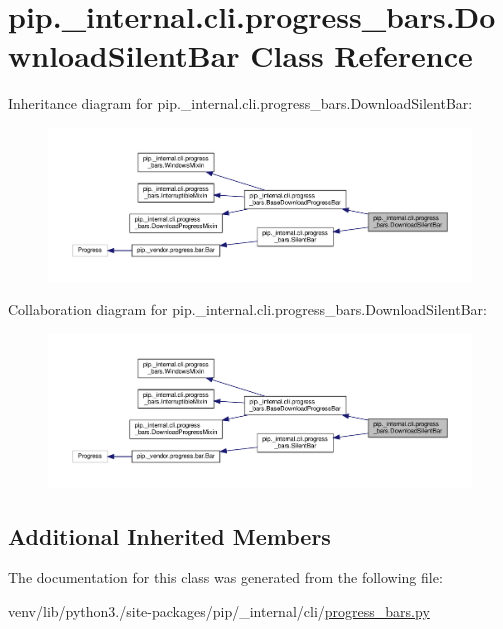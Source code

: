 \hypertarget{classpip_1_1__internal_1_1cli_1_1progress__bars_1_1DownloadSilentBar}{}\section{pip.\+\_\+internal.\+cli.\+progress\+\_\+bars.\+Download\+Silent\+Bar Class Reference}
\label{classpip_1_1__internal_1_1cli_1_1progress__bars_1_1DownloadSilentBar}


Inheritance diagram for pip.\+\_\+internal.\+cli.\+progress\+\_\+bars.\+Download\+Silent\+Bar\+:
\nopagebreak
\begin{figure}[H]
\begin{center}
\leavevmode
\includegraphics[width=350pt]{classpip_1_1__internal_1_1cli_1_1progress__bars_1_1DownloadSilentBar__inherit__graph}
\end{center}
\end{figure}


Collaboration diagram for pip.\+\_\+internal.\+cli.\+progress\+\_\+bars.\+Download\+Silent\+Bar\+:
\nopagebreak
\begin{figure}[H]
\begin{center}
\leavevmode
\includegraphics[width=350pt]{classpip_1_1__internal_1_1cli_1_1progress__bars_1_1DownloadSilentBar__coll__graph}
\end{center}
\end{figure}
\subsection*{Additional Inherited Members}


The documentation for this class was generated from the following file\+:\begin{DoxyCompactItemize}
\item 
venv/lib/python3./site-\/packages/pip/\+\_\+internal/cli/\hyperlink{progress__bars_8py}{progress\+\_\+bars.\+py}\end{DoxyCompactItemize}
